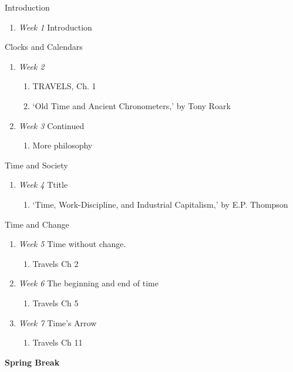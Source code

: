 \documentclass[article,oneside]{memoir}
\begin{document}
\begin{description}

\item[Module 0:] {Introduction}
\begin{enumerate}
\item \textit{Week 1} Introduction 
\end{enumerate}

\item[Module 1:]  Clocks and Calendars
\begin{enumerate}
\item \textit{Week 2}
\begin{enumerate}
\item TRAVELS, Ch. 1
\item `Old Time and Ancient Chronometers,' by Tony Roark
\end{enumerate}
\item \textit{Week 3} Continued
\begin{enumerate}
\item More philosophy
\end{enumerate}
\end{enumerate}
\item[Module 2:] Time and Society
\begin{enumerate}
\item \textit{Week 4} Ttitle
\begin{enumerate}
\item `Time, Work-Discipline, and Industrial Capitalism,' by E.P. Thompson\end{enumerate}
\end{enumerate}

\item[Module 4:] Time and Change
\begin{enumerate}
\item \textit{Week 5} Time without change. 
\begin{enumerate}
\item Travels Ch 2
\end{enumerate}
\item \textit{Week 6} The beginning and end of time
\begin{enumerate}
\item Travels Ch 5
\end{enumerate}
\item \textit{Week 7} Time's Arrow
\begin{enumerate}
\item Travels Ch 11
\end{enumerate}
\end{enumerate}
\item \textbf{Spring Break}


\end{description}
\end{document}
